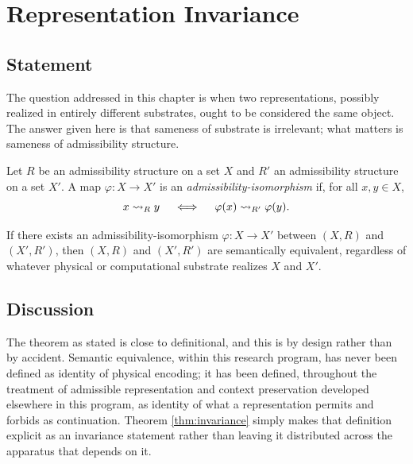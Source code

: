 \chapter{Representation Invariance}
\label{ch:invariance}

\section{Statement}

The question addressed in this chapter is when two representations,
possibly realized in entirely different substrates, ought to be
considered the same object. The answer given here is that sameness of
substrate is irrelevant; what matters is sameness of admissibility
structure.

\begin{definition}
Let $R$ be an admissibility structure on a set $X$ and $R'$ an
admissibility structure on a set $X'$. A map $\varphi : X \to X'$ is an
\emph{admissibility-isomorphism} if, for all $x, y \in X$,
\[
x \rightsquigarrow_{R} y \quad \iff \quad \varphi(x) \rightsquigarrow_{R'} \varphi(y).
\]
\end{definition}

\begin{theorem}
\label{thm:invariance}
If there exists an admissibility-isomorphism $\varphi : X \to X'$
between $(X, R)$ and $(X', R')$, then $(X, R)$ and $(X', R')$ are
semantically equivalent, regardless of whatever physical or
computational substrate realizes $X$ and $X'$.
\end{theorem}

\section{Discussion}

The theorem as stated is close to definitional, and this is by design
rather than by accident. Semantic equivalence, within this research
program, has never been defined as identity of physical encoding; it has
been defined, throughout the treatment of admissible representation and
context preservation developed elsewhere in this program, as identity of
what a representation permits and forbids as continuation. Theorem
\ref{thm:invariance} simply makes that definition explicit as an
invariance statement rather than leaving it distributed across the
apparatus that depends on it.

